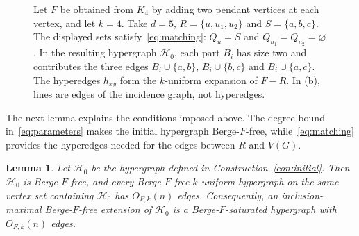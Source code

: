 \documentclass[10pt,a4paper]{article}
\numberwithin{equation}{section}
\newtheorem{lemma}[theorem]{Lemma}
\theoremstyle{definition}
\theoremstyle{plain}
\newcommand{\HH}{\mathcal H}
\begin{document}
\begin{figure}[!htbp]
\caption{Let $F$ be obtained from $K_4$ by adding two pendant vertices at
each vertex, and let $k=4$. Take $d=5$, $R=\{u,u_1,u_2\}$ and
$S=\{a,b,c\}$. The displayed sets satisfy~\eqref{eq:matching}:
$Q_u=S$ and $Q_{u_1}=Q_{u_2}=\varnothing$.
In the resulting hypergraph $\HH_0$, each part $B_i$ has size two
and contributes the three edges
$B_i\cup\{a,b\}$, $B_i\cup\{b,c\}$ and $B_i\cup\{a,c\}$.
The hyperedges $h_{xy}$ form the $k$-uniform expansion of $F-R$.
In (b), lines are edges of the incidence graph, not hyperedges.}
\label{fig:example}
\end{figure}

\FloatBarrier

The next lemma explains the conditions imposed above. The
degree bound in~\eqref{eq:parameters} makes the initial hypergraph
Berge-$F$-free, while~\eqref{eq:matching} provides the hyperedges needed
for the edges between $R$ and $V(G)$.

\begin{lemma}\label{lem:construction}
Let $\HH_0$ be the hypergraph defined in Construction~\ref{con:initial}.
Then $\HH_0$ is Berge-$F$-free, and every
Berge-$F$-free $k$-uniform hypergraph on the same vertex set containing
$\HH_0$ has $O_{F,k}(n)$ edges. Consequently, an inclusion-maximal
Berge-$F$-free extension of $\HH_0$ is a Berge-$F$-saturated hypergraph
with $O_{F,k}(n)$ edges.
\end{lemma}
\end{document}
